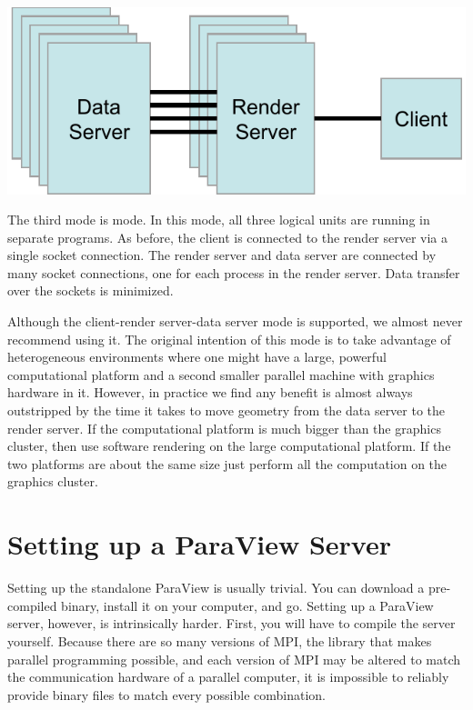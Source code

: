 \begin{inlinefig}
  \includegraphics[scale=\bbscale]{images/RunModeClientRenderDataServer}
\end{inlinefig}

The third mode is  mode.  In this
mode, all three logical units are running in separate programs.  As before,
the client is connected to the render server via a single socket
connection.  The render server and data server are connected by many socket
connections, one for each process in the render server.  Data transfer over
the sockets is minimized.

Although the client-render server-data server mode is supported, we almost
never recommend using it.  The original intention of this mode is to take
advantage of heterogeneous environments where one might have a large,
powerful computational platform and a second smaller parallel machine with
graphics hardware in it.  However, in practice we find any benefit is
almost always outstripped by the time it takes to move geometry from the
data server to the render server.  If the computational platform is much
bigger than the graphics cluster, then use software rendering on the large
computational platform.  If the two platforms are about the same size just
perform all the computation on the graphics cluster.

\section{Setting up a ParaView Server}

Setting up the standalone ParaView is usually trivial.  You can download a
pre-compiled binary, install it on your computer, and go.  Setting up a
ParaView server, however, is intrinsically harder.  First, you will have to
compile the server yourself.  Because there are so many versions of MPI,
the library that makes parallel programming possible, and each version of
MPI may be altered to match the communication hardware of a parallel
computer, it is impossible to reliably provide binary files to match every
possible combination.

